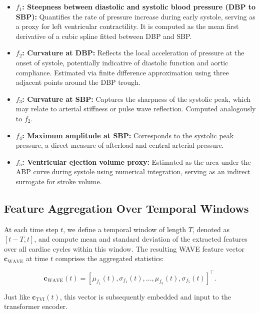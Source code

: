 \begin{itemize}
    \item \textbf{\(f_1\): Steepness between diastolic and systolic blood pressure (DBP to SBP):} Quantifies the rate of pressure increase during early systole, serving as a proxy for left ventricular contractility. It is computed as the mean first derivative of a cubic spline fitted between DBP and SBP.

    \item \textbf{\(f_2\): Curvature at DBP:} Reflects the local acceleration of pressure at the onset of systole, potentially indicative of diastolic function and aortic compliance. Estimated via finite difference approximation using three adjacent points around the DBP trough.

    \item \textbf{\(f_3\): Curvature at SBP:} Captures the sharpness of the systolic peak, which may relate to arterial stiffness or pulse wave reflection. Computed analogously to \(f_2\).

    \item \textbf{\(f_4\): Maximum amplitude at SBP:} Corresponds to the systolic peak pressure, a direct measure of afterload and central arterial pressure.

    \item \textbf{\(f_5\): Ventricular ejection volume proxy:} Estimated as the area under the ABP curve during systole using numerical integration, serving as an indirect surrogate for stroke volume.
\end{itemize}

\subsection{Feature Aggregation Over Temporal Windows}
At each time step $t$, we define a temporal window of length $T$, denoted as $[t - T, t]$, and compute mean and standard deviation of the extracted features over all cardiac cycles within this window.
The resulting WAVE feature vector $\mathbf{c}_{\text{WAVE}}$ at time $t$ comprises the aggregated statistics:

\begin{equation}
    \mathbf{c}_{\text{WAVE}}(t) = \left[ \mu_{f_1}(t), \sigma_{f_1}(t), \dots, \mu_{f_5}(t), \sigma_{f_5}(t) \right]^\top.
\end{equation}

Just like $\mathbf{c}_{\text{TVI}}(t)$, this vector is subsequently embedded and input to the transformer encoder.

